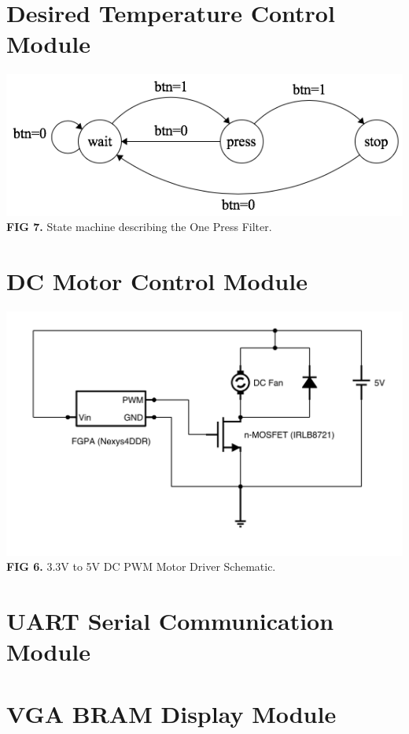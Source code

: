 \documentclass{article}
\begin{document}
\section{Desired Temperature Control Module}
\begin{center}
\includegraphics[scale=.5]{images/nopressMachine}\\
\textbf{FIG 7.} State machine describing the One Press Filter.\\
\end{center}
\section{DC Motor Control Module}
\begin{center}
\includegraphics[scale=.5]{images/pwmSchematic-nowords}\\
\textbf{FIG 6.} 3.3V to 5V DC PWM Motor Driver Schematic.\\
\end{center}
\section{UART Serial Communication Module}
\section{VGA BRAM Display Module}
\end{document}
